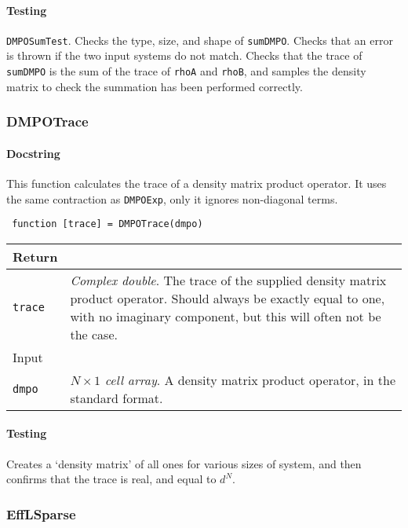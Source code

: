  \paragraph{Testing} \lstinline$DMPOSumTest$. Checks the type, size, and shape of \lstinline$sumDMPO$. Checks that an error is thrown if the two input systems do not match. Checks that the trace of \lstinline$sumDMPO$ is the sum of the trace of \lstinline$rhoA$ and \lstinline$rhoB$, and samples the density matrix to check the summation has been performed correctly.  

 \subsubsection{DMPOTrace}
 \paragraph{Docstring} This function calculates the trace of a density matrix product operator. It uses the same contraction as \lstinline$DMPOExp$, only it ignores non-diagonal terms. 
 \begin{lstlisting}
 function [trace] = DMPOTrace(dmpo) \end{lstlisting}
 \begin{longtabu}{X[1,l]X[4,l]}
 \hline
 Return & \\ \hline
 \lstinline$trace$ & \emph{Complex double}. The trace of the supplied density matrix product operator. Should always be exactly equal to one, with no imaginary component, but this will often not be the case. \\ \hline
 Input & \\ \hline
 \lstinline$dmpo$ & \emph{\(N \times 1\) cell array}. A density matrix product operator, in the standard format. \\
 \hline
 \end{longtabu}
 \paragraph{Testing} Creates a `density matrix' of all ones for various sizes of system, and then confirms that the trace is real, and equal to \(d^{N}\). 

 \subsubsection{EffLSparse}
